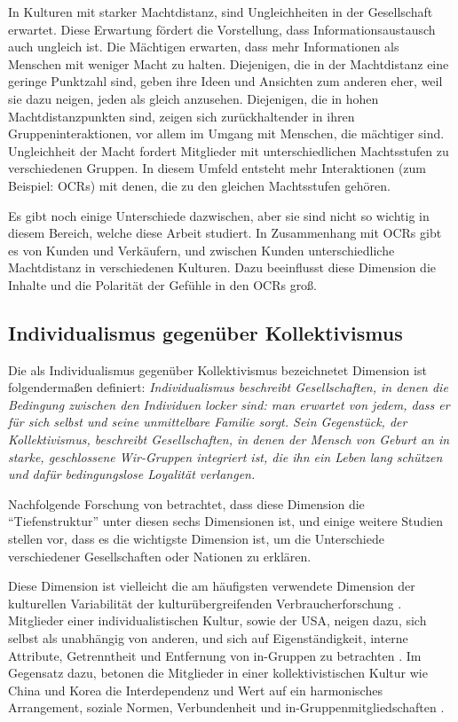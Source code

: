 In Kulturen mit starker Machtdistanz, sind Ungleichheiten in der Gesellschaft erwartet. Diese Erwartung fördert die Vorstellung, dass Informationsaustausch auch ungleich ist. Die Mächtigen erwarten, dass mehr Informationen als Menschen mit weniger Macht zu halten. Diejenigen, die in der Machtdistanz eine geringe Punktzahl sind, geben ihre Ideen und Ansichten zum anderen eher, weil sie dazu neigen, jeden als gleich anzusehen. Diejenigen, die in hohen Machtdistanzpunkten sind, zeigen sich zurückhaltender in ihren Gruppeninteraktionen, vor allem im Umgang mit Menschen, die mächtiger sind. Ungleichheit der Macht fordert Mitglieder mit unterschiedlichen Machtsstufen zu verschiedenen Gruppen. In diesem Umfeld entsteht mehr Interaktionen (zum Beispiel: \ac{OCRs}) mit denen, die zu den gleichen Machtsstufen gehören. \citep{Lam2009} 

Es gibt noch einige Unterschiede dazwischen, aber sie sind nicht so wichtig in diesem Bereich, welche diese Arbeit studiert. In Zusammenhang mit \ac{OCRs} gibt es von Kunden und Verkäufern, und zwischen Kunden unterschiedliche Machtdistanz in verschiedenen Kulturen. Dazu beeinflusst diese Dimension die Inhalte und die Polarität der Gefühle in den \ac{OCRs} groß.
\subsection{Individualismus gegenüber Kollektivismus}
Die als Individualismus gegenüber Kollektivismus bezeichnetet Dimension ist folgendermaßen definiert: \emph{Individualismus beschreibt Gesellschaften, in denen die Bedingung zwischen den Individuen locker sind: man erwartet von jedem, dass er für sich selbst und seine unmittelbare Familie sorgt. Sein Gegenstück, der Kollektivismus, beschreibt Gesellschaften, in denen der Mensch von Geburt an in starke, geschlossene Wir-Gruppen integriert ist, die ihn ein Leben lang schützen und dafür bedingungslose Loyalität verlangen.} \citep[p. ~67]{hofstede2013interkulturelle}

Nachfolgende Forschung von \citet{grennfield2000approaches} betrachtet, dass diese Dimension die ``Tiefenstruktur'' unter diesen sechs Dimensionen ist, und einige weitere Studien \citep{sia2009web, triandis2001individualism} stellen vor, dass es die wichtigste Dimension ist, um die Unterschiede verschiedener Gesellschaften oder Nationen zu erklären.

Diese Dimension ist vielleicht die am häufigsten verwendete Dimension der kulturellen Variabilität der kulturübergreifenden Verbraucherforschung \citep{aaker1997effect, han1994persuasion}. Mitglieder einer individualistischen Kultur, sowie der USA, neigen dazu, sich selbst als unabhängig von anderen, und sich auf Eigenständigkeit, interne Attribute, Getrenntheit und Entfernung von in-Gruppen zu betrachten \citep{singelis1994measurement}. Im Gegensatz dazu, betonen die Mitglieder in einer kollektivistischen Kultur wie China und Korea die Interdependenz und Wert auf ein harmonisches Arrangement, soziale Normen, Verbundenheit und in-Gruppenmitgliedschaften \citep{singelis1994measurement}.

